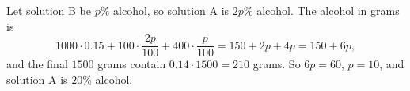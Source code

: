 Let solution B be $p\%$ alcohol, so solution A is $2p\%$ alcohol. The alcohol in grams is
\[
1000\cdot0.15+100\cdot\dfrac{2p}{100}+400\cdot\dfrac{p}{100}=150+2p+4p=150+6p ,
\]
and the final $1500$ grams contain $0.14\cdot1500=210$ grams. So $6p=60$, $p=10$, and solution A is $\boxed{20\%}$ alcohol.
